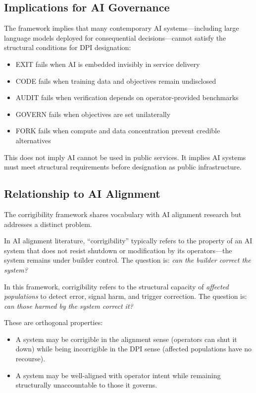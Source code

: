 \documentclass[11pt,a4paper]{article}
\begin{document}
\subsection{Implications for AI Governance}

The framework implies that many contemporary AI systems---including large language models deployed for consequential decisions---cannot satisfy the structural conditions for DPI designation:

\begin{itemize}
    \item EXIT fails when AI is embedded invisibly in service delivery
    \item CODE fails when training data and objectives remain undisclosed
    \item AUDIT fails when verification depends on operator-provided benchmarks
    \item GOVERN fails when objectives are set unilaterally
    \item FORK fails when compute and data concentration prevent credible alternatives
\end{itemize}

This does not imply AI cannot be used in public services. It implies AI systems must meet structural requirements before designation as public infrastructure.

\subsection{Relationship to AI Alignment}

The corrigibility framework shares vocabulary with AI alignment research but addresses a distinct problem.

In AI alignment literature, ``corrigibility'' typically refers to the property of an AI system that does not resist shutdown or modification by its operators---the system remains under builder control. The question is: \textit{can the builder correct the system?}

In this framework, corrigibility refers to the structural capacity of \textit{affected populations} to detect error, signal harm, and trigger correction. The question is: \textit{can those harmed by the system correct it?}

These are orthogonal properties:
\begin{itemize}
    \item A system may be corrigible in the alignment sense (operators can shut it down) while being incorrigible in the DPI sense (affected populations have no recourse).
    \item A system may be well-aligned with operator intent while remaining structurally unaccountable to those it governs.
\end{itemize}
\end{document}
